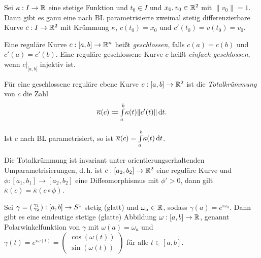 \documentclass{cheat-sheet}
\newcommand{\Intabdt}[1]{\Int{a}{b}{#1}{t}}
\begin{document}
\begin{satz}
  Sei $\kappa : I \to \mathbb{R}$ eine stetige Funktion und $t_0 \in I$ und $x_0, v_0 \in \mathbb{R}^2$ mit $\| v_0 \| = 1$. Dann gibt es ganu eine nach BL parametrisierte zweimal stetig differenzierbare Kurve $c : I \to \mathbb{R}^2$ mit Krümmung $\kappa$, $c(t_0) = x_0$ und $c'(t_0) = v(t_0) = v_0$.
\end{satz}

\begin{definition}
  Eine reguläre Kurve $c : [a, b] \to \mathbb{R}^n$ heißt \emph{geschlossen}, falls $c(a) = c(b)$ und $c'(a) = c'(b)$.
  Eine reguläre geschlossene Kurve $c$ heißt \emph{einfach geschlossen}, wenn $c|_{[a, b[}$ injektiv ist.
\end{definition}

\begin{definition}
  Für eine geschlossene reguläre ebene Kurve $c : [a, b] \to \mathbb{R}^2$ ist die \emph{Totalkrümmung} von $c$ die Zahl
  \[ \overline{\kappa}(c) \coloneqq \Intabdt{\kappa(t) \| c'(t) \|}. \]
\end{definition}

\begin{bem}
  Ist $c$ nach BL parametrisiert, so ist $\overline{\kappa}(c) = \Intabdt{\kappa(t)}$.
\end{bem}

\begin{satz}
  Die Totalkrümmung ist invariant unter orientierungserhaltenden Umparametrisierungen, d.\,h. ist $c : [a_2, b_2] \to \mathbb{R}^2$ eine reguläre Kurve und $\phi : [a_1, b_1] \to [a_2, b_2]$ eine Diffeomorphismus mit $\phi' > 0$, dann gilt $\overline\kappa(c) = \overline\kappa(c \circ \phi)$.
\end{satz}

\begin{satz}
  Sei $\gamma = \begin{psmallmatrix} \gamma_1 \\ \gamma_2 \end{psmallmatrix} : [a, b] \to S^1$ stetig (glatt) und $\omega_a \in \mathbb{R}$, sodass $\gamma(a) = e^{i \omega_a}$. Dann gibt es eine eindeutige stetige (glatte) Abbildung $\omega : [a, b] \to \mathbb{R}$, genannt Polarwinkelfunktion von $\gamma$ mit $\omega(a) = \omega_a$ und $\gamma(t) = e^{i \omega(t)} = \begin{pmatrix} \cos(\omega(t)) \\ \sin(\omega(t)) \end{pmatrix}$ für alle $t \in [a, b]$.
\end{satz}
\end{document}
